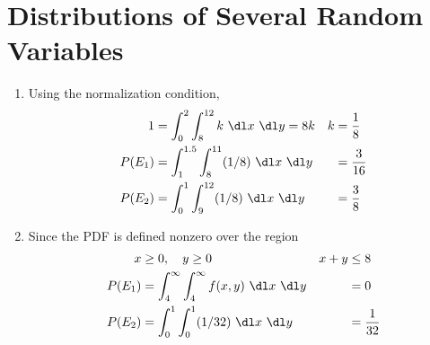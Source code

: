 \section{Distributions of Several Random Variables}

\begin{enumerate}
    \item Using the normalization condition,
          \begin{align}
              1      & = \int_{0}^{2} \int_{8}^{12} k\ \dl x\ \dl y = 8k  &
              k      & = \frac{1}{8}                                        \\
              P(E_1) & = \int_{1}^{1.5} \int_{8}^{11} (1/8)\ \dl x\ \dl y &
                     & = \frac{3}{16}                                       \\
              P(E_2) & = \int_{0}^{1} \int_{9}^{12} (1/8)\ \dl x\ \dl y   &
                     & = \frac{3}{8}
          \end{align}

    \item Since the PDF is defined nonzero over the region
          \begin{align}
              x      & \geq 0, \quad y \geq 0                                     &
              x+y    & \leq 8                                                       \\
              P(E_1) & = \int_{4}^{\infty} \int_{4}^{\infty} f(x,y)\ \dl x\ \dl y &
                     & = 0                                                          \\
              P(E_2) & = \int_{0}^{1} \int_{0}^{1} (1/32)\ \dl x\ \dl y           &
                     & = \frac{1}{32}
          \end{align}


\end{enumerate}
